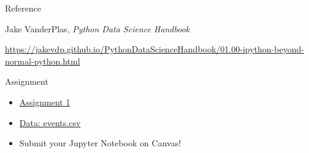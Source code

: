 \documentclass[aspectratio=43]{beamer}
\begin{document}
\begin{frame}{Reference}

Jake VanderPlas, \textit{Python Data Science Handbook}

\url{https://jakevdp.github.io/PythonDataScienceHandbook/01.00-ipython-beyond-normal-python.html}

\end{frame}

\begin{frame}{Assignment}

\begin{itemize}
\item \href{}{Assignment 1}
\item \href{https://abuabara.github.io/DAEN300F26/events.csv}{Data: events.csv}
\item Submit your Jupyter Notebook on Canvas!
\end{itemize}
\end{frame}
\end{document}
